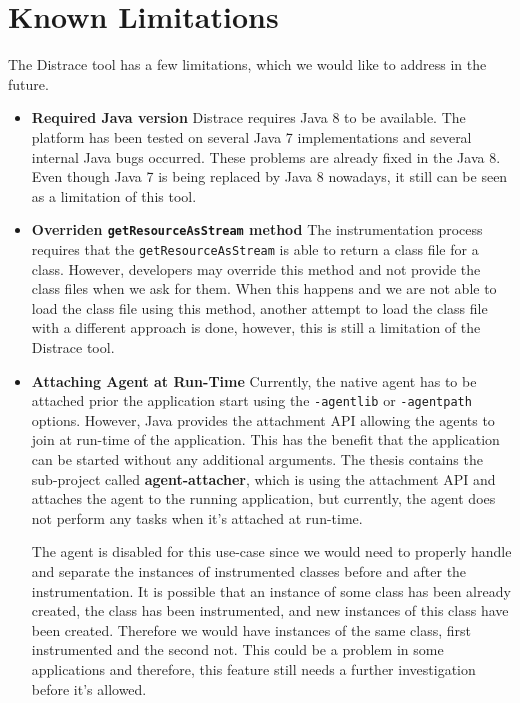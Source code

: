 \section{Known Limitations}
The Distrace tool has a few limitations, which we would like to address in the future.
\begin{itemize}
	\item \textbf{Required Java version} \newline
	Distrace requires Java 8 to be available. The platform has been tested on several Java 7 implementations and several internal Java bugs occurred. These problems are already fixed in the Java 8. Even though Java 7 is being replaced by Java 8 nowadays, it still can be seen as a limitation of this tool.
	\item \textbf{Overriden \texttt{getResourceAsStream} method} \newline
	The instrumentation process requires that the \texttt{getResourceAsStream} is able to return a class file for a class. However, developers may override this method and not provide the class files when we ask for them. When this happens and we are not able to load the class file using this method, another attempt to load the class file with a different approach is done, however, this is still a limitation of the Distrace tool.
	
	\item \textbf{Attaching Agent at Run-Time} \newline
	Currently, the native agent has to be attached prior the application start using the \texttt{-agentlib} or \texttt{-agentpath} options. However, Java provides the attachment API allowing the agents to join at run-time of the application. This has the benefit that the application can be started without any additional arguments. The thesis contains the sub-project called \textbf{agent-attacher}, which is using the attachment API and attaches the agent to the running application, but currently, the agent does not perform any tasks when it's attached at run-time.
	
	The agent is disabled for this use-case since we would need to properly handle and separate the instances of instrumented classes before and after the instrumentation. It is possible that an instance of some class has been already created, the class has been instrumented, and new instances of this class have been created. Therefore we would have instances of the same class, first instrumented and the second not. This could be a problem in some applications and therefore, this feature still needs a further investigation before it's allowed.
\end{itemize}




